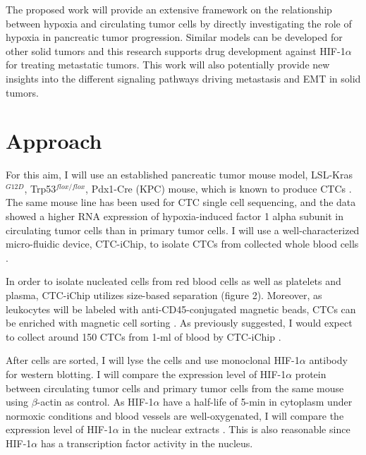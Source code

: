 \documentclass[11pts]{article}
\begin{document}
\newline
\noindent The proposed work will provide an extensive framework on the relationship between hypoxia and circulating tumor cells by directly investigating the role of hypoxia in pancreatic tumor progression. Similar models can be developed for other solid tumors and this research supports drug development against HIF-1$\alpha$ for treating metastatic tumors. This work will also potentially provide new insights into the different signaling pathways driving metastasis and EMT in solid tumors. 
\newline


\section{Approach}
\newline
For this aim, I will use an established pancreatic tumor mouse model, LSL-Kras$^{G12D}$, Trp53$^{flox/flox}$, Pdx1-Cre (KPC) mouse, which is known to produce CTCs \cite{Bardeesy:2006xy,Rhim:2012fk,Ting:zl}. The same mouse line has been used for CTC single cell sequencing, and the data showed a higher RNA expression of hypoxia-induced factor 1 alpha subunit in circulating tumor cells than in primary tumor cells\cite{Ting:zl}. I will use a well-characterized micro-fluidic device, CTC-iChip, to isolate CTCs from collected whole blood cells \cite{Ting:zl}. 
\newline

\noindent In order to isolate nucleated cells from red blood cells as well as platelets and plasma, CTC-iChip utilizes size-based separation (figure 2). Moreover, as leukocytes will be labeled with anti-CD45-conjugated magnetic beads, CTCs can be enriched with magnetic cell sorting \cite{Ting:zl}. As previously suggested, I would expect to collect around 150 CTCs from 1-ml of blood by CTC-iChip \cite{Ting:zl}.
 \newline


\noindent After cells are sorted, I will lyse the cells and use monoclonal HIF-1$\alpha$ antibody for western blotting. I will compare the expression level of HIF-1$\alpha$ protein between circulating tumor cells and primary tumor cells from the same mouse using $\beta$-actin as control. As HIF-1$\alpha$ have a half-life of 5-min in cytoplasm under normoxic conditions and blood vessels are well-oxygenated, I will compare the expression level of HIF-1$\alpha$ in the nuclear extracts \cite{Karuppagounder:2012sf}. This is also reasonable since HIF-1$\alpha$ has a transcription factor activity in the nucleus. 
\newline
\end{document}
